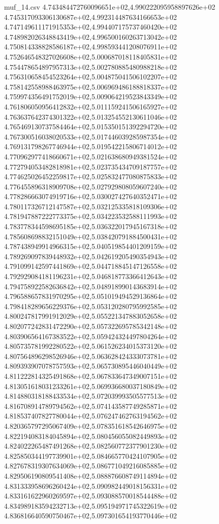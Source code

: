 \begin{filecontents*}{muf_14.csv}
4.743484472760096651e+02,4.990222095958897626e+02
4.745317093306130687e+02,4.992314487634166653e+02
4.747149611171915353e+02,4.994407175737460420e+02
4.748982026348843419e+02,4.996500160263713042e+02
4.750814338828586187e+02,4.998593441208076911e+02
4.752646548327026608e+02,5.000687018118405831e+02
4.754478654897957313e+02,5.002780885480988218e+02
4.756310658454523264e+02,5.004875041506102207e+02
4.758142558988463975e+02,5.006969486188818337e+02
4.759974356491752019e+02,5.009064219523843349e+02
4.761806050956412832e+02,5.011159241506165927e+02
4.763637642374301322e+02,5.013254552130611046e+02
4.765469130737584464e+02,5.015350151392294720e+02
4.767300516038020533e+02,5.017446039285987354e+02
4.769131798267746944e+02,5.019542215806714012e+02
4.770962977418660671e+02,5.021638680949381524e+02
4.772794053482818981e+02,5.023735434709187757e+02
4.774625026452259817e+02,5.025832477080875833e+02
4.776455896318909708e+02,5.027929808059607240e+02
4.778286663074919716e+02,5.030027427640352471e+02
4.780117326712147587e+02,5.032125335818109306e+02
4.781947887222773375e+02,5.034223532588111993e+02
4.783778344598695185e+02,5.036322017945167318e+02
4.785608698832151049e+02,5.038420791884500431e+02
4.787438949914966315e+02,5.040519854401209159e+02
4.789269097839448932e+02,5.042619205490354943e+02
4.791099142597441869e+02,5.044718845147126558e+02
4.792929084181196231e+02,5.046818773366412643e+02
4.794758922582636842e+02,5.048918990143683914e+02
4.796588657831970295e+02,5.051019494529136864e+02
4.798418289656229376e+02,5.053120280795992585e+02
4.800247817991912029e+02,5.055221347883052658e+02
4.802077242831472290e+02,5.057322695785342148e+02
4.803906564167383522e+02,5.059424324497804264e+02
4.805735781992280522e+02,5.061526234015373120e+02
4.807564896298526946e+02,5.063628424333073781e+02
4.809393907078757593e+02,5.065730895446040449e+02
4.811222814325491868e+02,5.067833647349007151e+02
4.813051618031233261e+02,5.069936680037180849e+02
4.814880318188433534e+02,5.072039993505577513e+02
4.816708914789794562e+02,5.074143587749285871e+02
4.818537407827780044e+02,5.076247462763194562e+02
4.820365797295067409e+02,5.078351618542646975e+02
4.822194083184045894e+02,5.080456055082449893e+02
4.824022265487491268e+02,5.082560772377901230e+02
4.825850344197739901e+02,5.084665770424107905e+02
4.827678319307634069e+02,5.086771049216085885e+02
4.829506190809541408e+02,5.088876608749114894e+02
4.831333958696260424e+02,5.090982449018156331e+02
4.833161622960269597e+02,5.093088570018544488e+02
4.834989183594232713e+02,5.095194971745322619e+02
4.836816640590750467e+02,5.097301654193770446e+02

\end{filecontents*}
